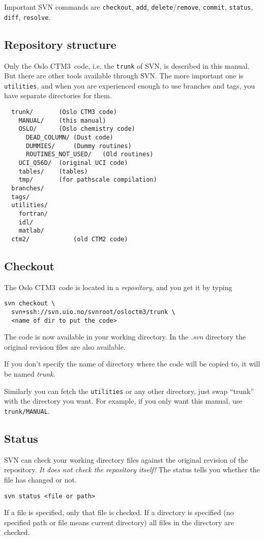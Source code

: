 \documentclass[10pt,a4paper,twocolumn]{article}
\newcommand{\model}{Oslo CTM3}
\begin{document}
Important SVN commands are \verb#checkout#, \verb#add#,
\verb#delete#/\verb#remove#, \verb#commit#, \verb#status#,
\verb#diff#, \verb#resolve#.



\subsection{Repository structure}
\label{app:svn_repository}
Only the \model\ code, i.e. the \verb#trunk# of SVN, is described
in this manual. But there are other tools available through SVN. The
more important one is \verb#utilities#, and when you are experienced
enough to use branches and tags, you have separate directories for them.
\begin{verbatim}
  trunk/       (Oslo CTM3 code)
    MANUAL/    (this manual)
    OSLO/      (Oslo chemistry code)
      DEAD_COLUMN/ (Dust code)
      DUMMIES/     (Dummy routines)
      ROUTINES_NOT_USED/   (Old routines)
    UCI_Q56D/  (original UCI code)
    tables/    (tables)
    tmp/       (for pathscale compilation)
  branches/
  tags/
  utilities/
    fortran/
    idl/
    matlab/
  ctm2/            (old CTM2 code)
\end{verbatim}


\subsection{Checkout}
The \model\ code is located in a {\it repository}, and you get it by
typing
{\small
\begin{verbatim}
svn checkout \
  svn+ssh://svn.uio.no/svnroot/osloctm3/trunk \
  <name of dir to put the code>
\end{verbatim}
}
The code is now available in your working directory. In the {\it .svn}
directory the original revision files are also available.

If you don't specify the name of directory where the code will be
copied to, it will be named {\it trunk}.

Similarly you can fetch the \verb#utilities# or any other directory,
just swap ``trunk'' with the directory you want. For example, if you
only want this manual, use \verb#trunk/MANUAL#.


\subsection{Status}
SVN can check your working directory files against the original
revision of the repository. {\it It does not check the repository
itself!} The status tells you whether the file has changed or not.
{\small
\begin{verbatim}
svn status <file or path>
\end{verbatim}
}
If a file is specified, only that file is checked. If a directory is
specified (no specified path or file means current directory) all
files in the directory are checked.
\end{document}
